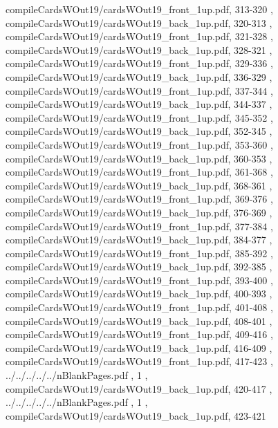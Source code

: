 \documentclass[letterpaper]{article}
\begin{document}
{									compileCardsWOut19/cardsWOut19_front_1up.pdf,		313-320		,
									compileCardsWOut19/cardsWOut19_back_1up.pdf,			320-313		,
									compileCardsWOut19/cardsWOut19_front_1up.pdf,		321-328		,
									compileCardsWOut19/cardsWOut19_back_1up.pdf,			328-321		,
									compileCardsWOut19/cardsWOut19_front_1up.pdf,		329-336		,
									compileCardsWOut19/cardsWOut19_back_1up.pdf,			336-329		,
									compileCardsWOut19/cardsWOut19_front_1up.pdf,		337-344		,
									compileCardsWOut19/cardsWOut19_back_1up.pdf,			344-337		,
									compileCardsWOut19/cardsWOut19_front_1up.pdf,		345-352		,
									compileCardsWOut19/cardsWOut19_back_1up.pdf,			352-345		,
									compileCardsWOut19/cardsWOut19_front_1up.pdf,		353-360		,
									compileCardsWOut19/cardsWOut19_back_1up.pdf,			360-353		,
									compileCardsWOut19/cardsWOut19_front_1up.pdf,		361-368		,
									compileCardsWOut19/cardsWOut19_back_1up.pdf,			368-361		,
									compileCardsWOut19/cardsWOut19_front_1up.pdf,		369-376		,
									compileCardsWOut19/cardsWOut19_back_1up.pdf,			376-369		,
									compileCardsWOut19/cardsWOut19_front_1up.pdf,		377-384		,
									compileCardsWOut19/cardsWOut19_back_1up.pdf,			384-377		,
									compileCardsWOut19/cardsWOut19_front_1up.pdf,		385-392		,
									compileCardsWOut19/cardsWOut19_back_1up.pdf,			392-385		,
									compileCardsWOut19/cardsWOut19_front_1up.pdf,		393-400		,
									compileCardsWOut19/cardsWOut19_back_1up.pdf,			400-393		,
									compileCardsWOut19/cardsWOut19_front_1up.pdf,		401-408		,
									compileCardsWOut19/cardsWOut19_back_1up.pdf,			408-401		,
									compileCardsWOut19/cardsWOut19_front_1up.pdf,		409-416		,
									compileCardsWOut19/cardsWOut19_back_1up.pdf,			416-409		,
									compileCardsWOut19/cardsWOut19_front_1up.pdf,		417-423		,
									../../../../../nBlankPages.pdf 											,			1							,
									compileCardsWOut19/cardsWOut19_back_1up.pdf,		420-417		,
									../../../../../nBlankPages.pdf 											,			1							,
									compileCardsWOut19/cardsWOut19_back_1up.pdf,		423-421		
								}
	
\end{document}
